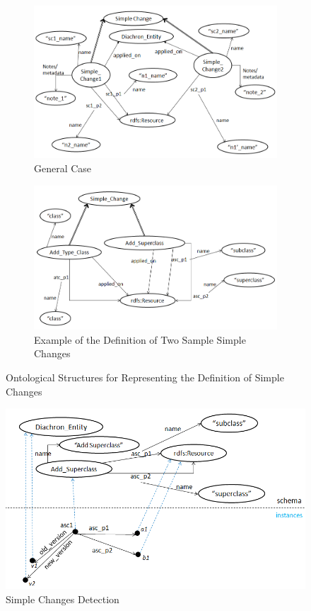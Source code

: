\begin{figure} [h]
	\centering
    \begin{subfigure}[b]{0.7\textwidth}
		\includegraphics[width=\textwidth]{figures/Slide4.PNG}
	    \caption{General Case}
        \label{fig:simple changes}
    \end{subfigure}
        \begin{subfigure}[b]{0.7\textwidth}
        \includegraphics[width=\textwidth]{figures/Slide5.PNG}
        \caption{Example of the Definition of Two Sample Simple Changes}
        \label{fig:ebi simple changes}
	\end{subfigure}
    \caption{Ontological Structures for Representing the Definition of Simple Changes}
    \label{fig:simplchan}
\end{figure}

\begin{figure}[t]
\centering
\includegraphics[width=120mm]{figures/Slide6.PNG}
\caption{Simple Changes Detection}
\label{fig:sc detection}
\end{figure}

